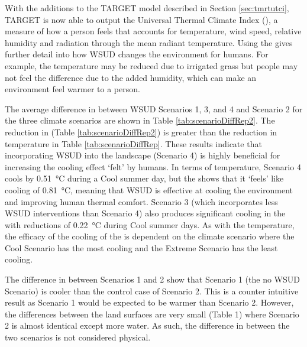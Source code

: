 \documentclass[final,3p,times,authoryear]{elsarticle}
\begin{document}
With the additions to the TARGET model described in Section \ref{sec:tmrtutci}, TARGET is now able to output the Universal Thermal Climate Index (), a measure of how a person feels that accounts for temperature, wind speed, relative humidity and radiation through the mean radiant temperature. Using the  gives further detail into how WSUD changes the environment for humans. For example, the temperature may be reduced due to irrigated grass but people may not feel the difference due to the added humidity, which can make an environment feel warmer to a person.

The average difference in  between WSUD Scenarios 1, 3, and 4 and Scenario 2 for the three climate scenarios are shown in Table \ref{tab:scenarioDiffRep2}. The reduction in  (Table \ref{tab:scenarioDiffRep2}) is greater than the reduction in temperature in Table \ref{tab:scenarioDiffRep}. These results indicate that incorporating WSUD into the landscape (Scenario 4) is highly beneficial for increasing the cooling effect `felt' by humans. In terms of temperature, Scenario 4 cools by 0.51\SI{}{\degreeCelsius} during a Cool summer day, but the  shows that it ‘feels’ like cooling of 0.81\SI{}{\degreeCelsius}, meaning that WSUD is effective at cooling the environment and improving human thermal comfort. Scenario 3 (which incorporates less WSUD interventions than Scenario 4) also produces significant cooling in the  with reductions of 0.22\SI{}{\degreeCelsius} during Cool summer days. As with the temperature, the efficacy of the cooling of the  is dependent on the climate scenario where the Cool Scenario has the most cooling and the Extreme Scenario has the least cooling. 

The difference in  between Scenarios 1 and 2 show that Scenario 1 (the no WSUD Scenario) is cooler than the control case of Scenario 2. This is a counter intuitive result as Scenario 1 would be expected to be warmer than Scenario 2. However, the differences between the land surfaces are very small (Table 1) where Scenario 2 is almost identical except more water. As such, the difference in  between the two scenarios is not considered physical. 
\end{document}
